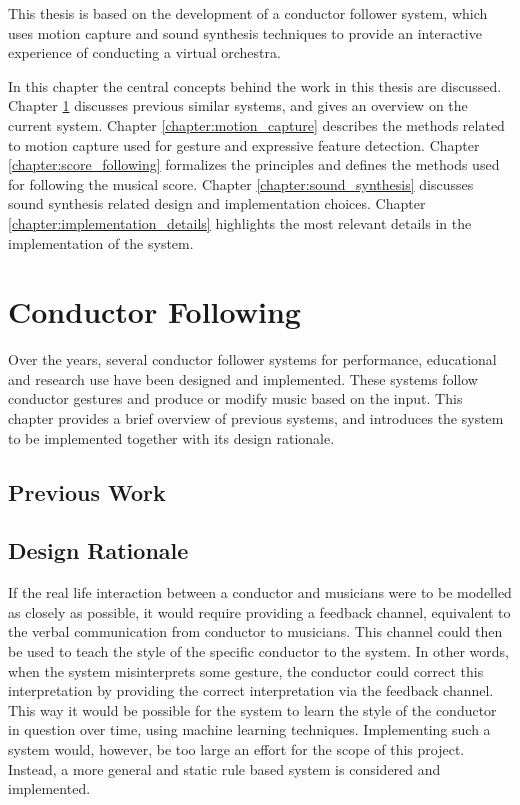 This thesis is based on the development of
a conductor follower system,
which uses motion capture and sound synthesis techniques
to provide an interactive experience of conducting a virtual orchestra.

In this chapter the central concepts behind
the work in this thesis are discussed.
Chapter \ref{chapter:conductor_following} discusses
previous similar systems, and gives an overview on the current system.
Chapter \ref{chapter:motion_capture} describes the
methods related to motion capture used for
gesture and expressive feature detection.
Chapter \ref{chapter:score_following}
formalizes the principles
and defines the methods used for following the musical score.
Chapter \ref{chapter:sound_synthesis}
discusses sound synthesis related design and
implementation choices.
Chapter \ref{chapter:implementation_details}
highlights the most relevant details
in the implementation of the system.

\chapter{Conductor Following}
\label{chapter:conductor_following}

Over the years, several conductor follower systems for
performance, educational and research use have been designed and implemented.
These systems follow conductor gestures
and produce or modify music based on the input.
This chapter provides a brief overview of previous systems,
and introduces the system to be implemented together with its design rationale.

\section{Previous Work}




\section{Design Rationale}

If the real life interaction between a conductor and musicians
were to be modelled as closely as possible,
it would require providing a feedback channel,
equivalent to the verbal communication from conductor to musicians.
This channel could then be used to teach the
style of the specific conductor to the system.
In other words, when the system misinterprets some gesture,
the conductor could correct this interpretation by 
providing the correct interpretation via the feedback channel.
This way it would be possible for the system to
learn the style of the conductor in question over time,
using machine learning techniques.
Implementing such a system would, however,
be too large an effort for the scope of this project.
Instead, a more general and static rule based system is
considered and implemented.

